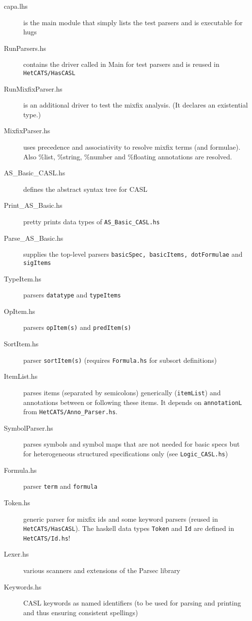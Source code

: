 \documentclass{article}
\begin{document}
\begin{description}
\item[capa.lhs] is the main module that simply lists the test parsers
  and is executable for hugs
\item[RunParsers.hs] contains the driver called in Main for test parsers and is reused in \texttt{HetCATS/HasCASL}
\item[RunMixfixParser.hs] is an additional driver to test the mixfix
  analysis. (It declares an existential type.)
\item[MixfixParser.hs] uses precedence and associativity to resolve
  mixfix terms (and formulae). Also \%list, \%string, \%number and
  \%floating annotations are resolved. 
\item[AS\_Basic\_CASL.hs] defines the abstract syntax tree for CASL
\item[Print\_AS\_Basic.hs] pretty prints data types of
  \texttt{AS\_Basic\_CASL.hs}
\item[Parse\_AS\_Basic.hs] supplies the top-level parsers \texttt{basicSpec,
  basicItems, dotFormulae} and \texttt{sigItems}
\item[TypeItem.hs] parsers \texttt{datatype} and \texttt{typeItems}
\item[OpItem.hs] parsers \texttt{opItem(s)} and \texttt{predItem(s)}
\item[SortItem.hs] parser \texttt{sortItem(s)} (requires \texttt{Formula.hs} for subsort definitions)
\item[ItemList.hs] parses items (separated by semicolons) generically
  (\texttt{itemList}) and annotations between or following these
  items. It depends on \texttt{annotationL} from
  \texttt{HetCATS/Anno\_Parser.hs}.
\item[SymbolParser.hs] parses symbols and symbol maps that are not
  needed for basic specs but for heterogeneous structured
  specifications only (see \texttt{Logic\_CASL.hs})
\item[Formula.hs] parser \texttt{term} and \texttt{formula}
\item[Token.hs] generic parser for mixfix ids and some keyword parsers
  (reused in \texttt{HetCATS/HasCASL}). The haskell data types
  \texttt{Token} and \texttt{Id} are defined in \texttt{HetCATS/Id.hs}!
\item[Lexer.hs] various scanners and extensions of the Parsec library 
\item[Keywords.hs] CASL keywords as named identifiers (to be used
  for parsing and printing and thus ensuring consistent spellings)
\end{description}
\end{document}
